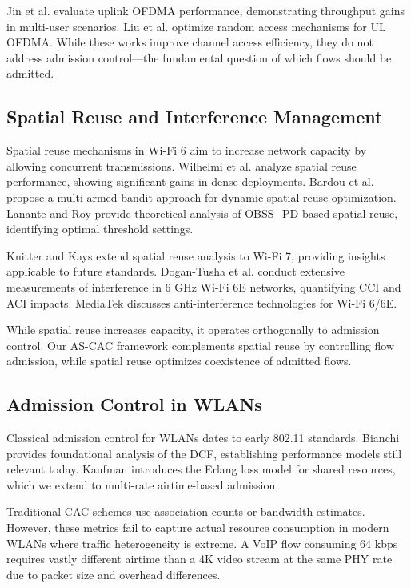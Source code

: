 \documentclass[conference]{IEEEtran}
\begin{document}
Jin et al. \cite{7} evaluate uplink OFDMA performance, demonstrating throughput gains in multi-user scenarios. Liu et al. \cite{11} optimize random access mechanisms for UL OFDMA. While these works improve channel access efficiency, they do not address admission control—the fundamental question of which flows should be admitted.

\subsection{Spatial Reuse and Interference Management}

Spatial reuse mechanisms in Wi-Fi 6 aim to increase network capacity by allowing concurrent transmissions. Wilhelmi et al. \cite{17} analyze spatial reuse performance, showing significant gains in dense deployments. Bardou et al. \cite{1} propose a multi-armed bandit approach for dynamic spatial reuse optimization. Lanante and Roy \cite{10} provide theoretical analysis of OBSS\_PD-based spatial reuse, identifying optimal threshold settings.

Knitter and Kays \cite{9} extend spatial reuse analysis to Wi-Fi 7, providing insights applicable to future standards. Dogan-Tusha et al. \cite{4} conduct extensive measurements of interference in 6 GHz Wi-Fi 6E networks, quantifying CCI and ACI impacts. MediaTek \cite{12} discusses anti-interference technologies for Wi-Fi 6/6E.

While spatial reuse increases capacity, it operates orthogonally to admission control. Our AS-CAC framework complements spatial reuse by controlling flow admission, while spatial reuse optimizes coexistence of admitted flows.

\subsection{Admission Control in WLANs}

Classical admission control for WLANs dates to early 802.11 standards. Bianchi \cite{3} provides foundational analysis of the DCF, establishing performance models still relevant today. Kaufman \cite{8} introduces the Erlang loss model for shared resources, which we extend to multi-rate airtime-based admission.

Traditional CAC schemes use association counts or bandwidth estimates. However, these metrics fail to capture actual resource consumption in modern WLANs where traffic heterogeneity is extreme. A VoIP flow consuming 64 kbps requires vastly different airtime than a 4K video stream at the same PHY rate due to packet size and overhead differences.
\end{document}
